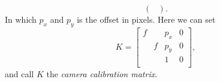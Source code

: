\documentclass[twocolumn]{article}
\begin{document}
\begin{itemize}
\begin{enumerate}
\begin{equation}
\begin{pmatrix}
                \end{pmatrix}.
            \end{equation}
            In which $p_x$ and $p_y$ is the offset in pixels. Here we can set \begin{equation}
                K = \begin{bmatrix}
                    f & & p_x & 0 \\
                     & f & p_y & 0 \\
                     & & 1 & 0 \\
                \end{bmatrix},
            \end{equation}
            and call $K$ the \textit{camera calibration matrix}.
    \end{enumerate}
\end{itemize}
\end{document}
